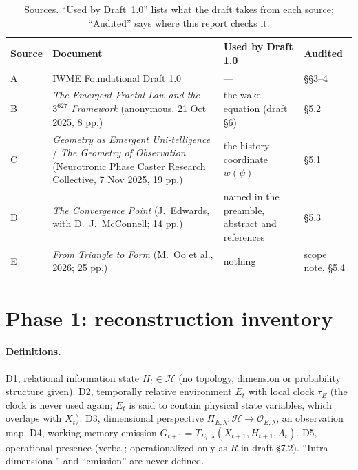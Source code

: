 \documentclass[11pt]{article}
\theoremstyle{definition}
\theoremstyle{remark}
\begin{document}
\begin{table}[ht]
\centering\small
\caption{Sources. ``Used by Draft~1.0'' lists what the draft takes from each source; ``Audited'' says where this report checks it.}
\label{tab:sources}
\begin{tabularx}{\textwidth}{@{}l>{\raggedright\arraybackslash}X>{\raggedright\arraybackslash}X>{\raggedright\arraybackslash}p{2.6cm}@{}}
\toprule
Source & Document & Used by Draft 1.0 & Audited \\
\midrule
A & IWME Foundational Draft 1.0 & --- & \S\S3--4 \\
B & \emph{The Emergent Fractal Law and the $3^{627}$ Framework} (anonymous, 21 Oct 2025, 8 pp.) & the wake equation (draft \S6) & \S5.2 \\
C & \emph{Geometry as Emergent Uni-telligence} / \emph{The Geometry of Observation} (Neurotronic Phase Caster Research Collective, 7 Nov 2025, 19 pp.) & the history coordinate $w(\psi)$ & \S5.1 \\
D & \emph{The Convergence Point} (J.\ Edwards, with D.\ J.\ McConnell; 14 pp.) & named in the preamble, abstract and references & \S5.3 \\
E & \emph{From Triangle to Form} (M.\ Oo et al., 2026; 25 pp.) & nothing & scope note, \S5.4 \\
\bottomrule
\end{tabularx}
\end{table}

\section{Phase 1: reconstruction inventory}

\paragraph{Definitions.} D1, relational information state $H_t\in\mathcal H$ (no topology, dimension or probability structure given). D2, temporally relative environment $E_t$ with local clock $\tau_E$ (the clock is never used again; $E_t$ is said to contain physical state variables, which overlaps with $X_t$). D3, dimensional perspective $\Pi_{E,\lambda}:\mathcal H\to\mathcal O_{E,\lambda}$, an observation map. D4, working memory emission $G_{t+1}=T_{E_t,\lambda}(X_{t+1},H_{t+1},A_t)$. D5, operational presence (verbal; operationalized only as $R$ in draft \S7.2). ``Intra-dimensional'' and ``emission'' are never defined.
\end{document}
